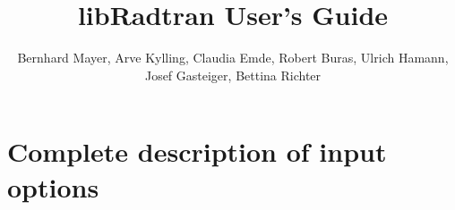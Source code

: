 \documentclass[11pt,twoside,a4paper,fleqn]{book}
\title{libRadtran User's Guide}
\author{Bernhard Mayer, Arve Kylling, Claudia Emde,
  Robert Buras, Ulrich Hamann, Josef Gasteiger, Bettina Richter}
\begin{document}

 

%
\newpage
\thispagestyle{empty}
\rule{0pt}{10pt}
\newpage

\tableofcontents

\cleardoublepage
{}











\chapter{Complete description of input options}
\label{chap:complete-description-input-options}



\clearpage 


\clearpage 
{}
{}


\clearpage
{}
{}
\printindex
\end{document}
